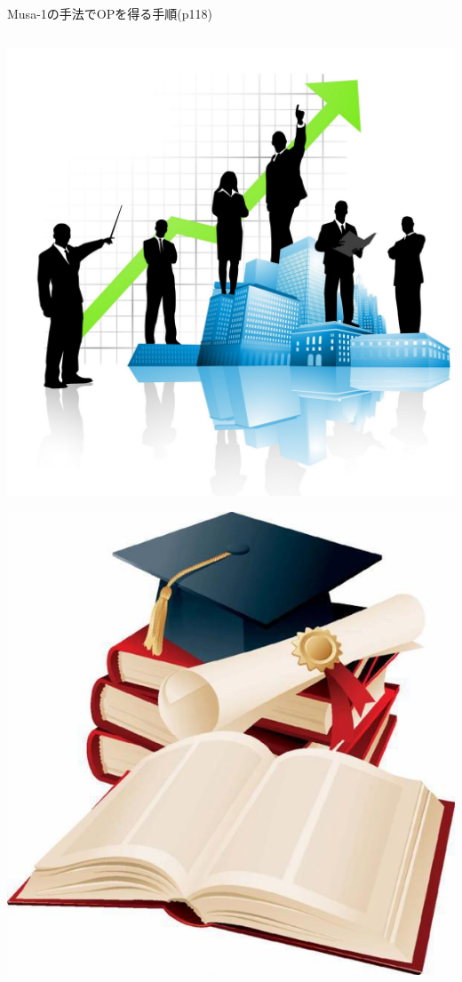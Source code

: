 \begin{frame}{Musa-1の手法でOPを得る手順(p118)}
\begin{columns}
{\begin{column}{0.5\textwidth}
\begin{center}
\includegraphics[height=\imageheight]{figure/corporate.jpg}

\includegraphics[height=\imageheight]{figure/education.jpg}
\end{center}
\end{column}
}


\end{columns}
\end{frame}
